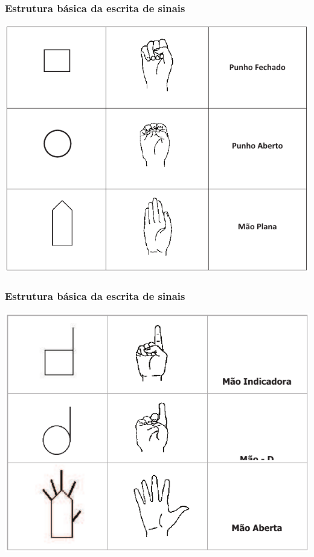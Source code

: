 \documentclass[10pt]{beamer}
\theoremstyle{plain}
\theoremstyle{definition}
\begin{document}
	\begin{frame}
		\frametitle{Estrutura básica da escrita de sinais}
		\begin{center}
			\includegraphics[scale=0.54]{figures/basico.png}
		\end{center}
	\end{frame}

	\begin{frame}
		\frametitle{Estrutura básica da escrita de sinais}
		\begin{center}
			\includegraphics[scale=0.54]{figures/basico2.png}
		\end{center}
	\end{frame}
\end{document}
